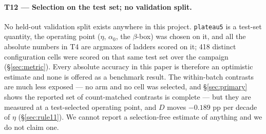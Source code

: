 \documentclass[10pt,letterpaper]{article}
\newcommand{\Dstat}{D}                         %
\newcommand{\plateau}{\texttt{plateau5}}
\begin{document}
\paragraph{T12 --- Selection on the test set; no validation split.}
No held-out validation split exists anywhere in this project. \plateau{} is a test-set quantity,
the operating point ($\eta$, $\alpha_0$, the $\beta$-box) was chosen on it, and all the absolute
numbers in T4 are argmaxes of ladders scored on it; 418 distinct configuration cells were scored on
that same test set over the campaign (\S\ref{sec:metric}). Every absolute accuracy in this paper is
therefore an optimistic estimate and none is offered as a benchmark result. The within-batch
contrasts are much less exposed --- no arm and no cell was selected, and \S\ref{sec:primary} shows
the reported set of count-matched contrasts is complete --- but they are measured at a
test-selected operating point, and $\Dstat$ moves $-0.189$ pp per decade of $\eta$
(\S\ref{sec:rule11}). We cannot report a selection-free estimate of anything and we do not claim
one.
\end{document}
